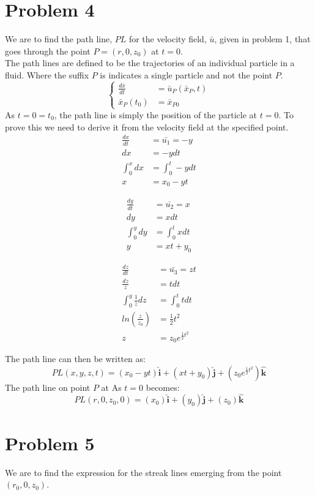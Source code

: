 \documentclass[11pt,a4paper,english]{article}
\numberwithin{equation}{section}
\let\oldhat\hat
\renewcommand{\hat}[1]{\mathbf{\oldhat{#1}}}
\begin{document}
\section{Problem 4}
We are to find the path line, $PL$ for the velocity field, $\bar{u}$, given in problem 1, that goes through the point $P = (r, 0, z_{0})$ at $t=0$.
\\
The path lines are defined to be the trajectories of an individual particle in a fluid.
Where the suffix $P$ is indicates a single particle and not the point $P$.
\[ 
\begin{cases} 
   \frac{d\bar{x}}{dt} &= \bar{u}_{P}(\bar{x}_{P}, t)	\\
   \bar{x}_{P}(t_{0})  &= \bar{x}_{P0}  
\end{cases} 
\]
As $t=0 = t_{0}$, the path line is simply the position of the particle at $t=0$. To prove this we need to derive it from the velocity field at the specified point.
\begin{align*}
	\frac{dx}{dt} &= \bar{u_1} = -y 	\\	
	dx &= -ydt						\\
	\int_0^x dx &= \int_0^t -ydt	\\
	x &= x_0 - yt
\end{align*}

\begin{align*}
	\frac{dy}{dt} &= \bar{u_2} = x 	\\	
	dy &= xdt						\\
	\int_0^y dy &= \int_0^t xdt	\\
	y &= xt + y_0
\end{align*}

\begin{align*}
	\frac{dz}{dt} 			&= \bar{u_3} = zt 			\\	
	\frac{dz}{z} 			&= tdt						\\
	\int_0^y \frac{1}{z}dz 	&= \int_0^t tdt				\\
	ln(\frac{z}{z_0}) 		&= \frac{1}{2}t^2			\\
	z &= z_0 e^{\frac{1}{2}t^2}
\end{align*}

The path line can then be written as:
$$PL(x, y, z, t) = (x_0 - yt)\hat{i} + (xt+y_0)\hat{j} + (z_0 e^{\frac{1}{2}t^2})\hat{k}$$
The path line on point $P$ at As $t=0$ becomes:
$$PL(r, 0, z_0, 0) = (x_0)\hat{i} + (y_0)\hat{j} + (z_0)\hat{k}$$

\section{Problem 5}
We are to find the expression for the streak lines emerging from the point $(r_0, 0, z_0)$. \\
\end{document}

